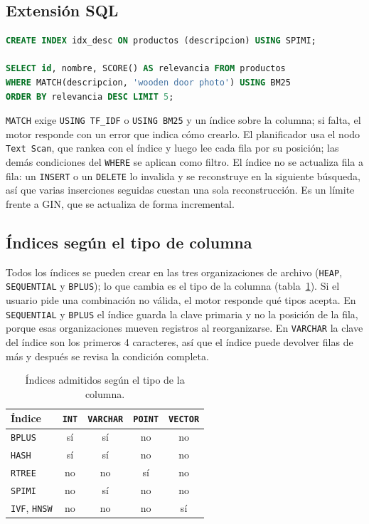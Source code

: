 \documentclass[11pt,a4paper]{article}
\begin{document}
\subsection{Extensión SQL}

\begin{lstlisting}[language=SQL]
CREATE INDEX idx_desc ON productos (descripcion) USING SPIMI;

SELECT id, nombre, SCORE() AS relevancia FROM productos
WHERE MATCH(descripcion, 'wooden door photo') USING BM25
ORDER BY relevancia DESC LIMIT 5;
\end{lstlisting}

\texttt{MATCH} exige \texttt{USING TF\_IDF} o \texttt{USING BM25} y un índice sobre la columna; si falta, el motor responde con un error que indica cómo crearlo. El planificador usa el nodo \texttt{Text Scan}, que rankea con el índice y luego lee cada fila por su posición; las demás condiciones del \texttt{WHERE} se aplican como filtro. El índice no se actualiza fila a fila: un \texttt{INSERT} o un \texttt{DELETE} lo invalida y se reconstruye en la siguiente búsqueda, así que varias inserciones seguidas cuestan una sola reconstrucción. Es un límite frente a GIN, que se actualiza de forma incremental.

\subsection{Índices según el tipo de columna}

Todos los índices se pueden crear en las tres organizaciones de archivo (\texttt{HEAP}, \texttt{SEQUENTIAL} y \texttt{BPLUS}); lo que cambia es el tipo de la columna (tabla~\ref{tab:indices-tipo}). Si el usuario pide una combinación no válida, el motor responde qué tipos acepta. En \texttt{SEQUENTIAL} y \texttt{BPLUS} el índice guarda la clave primaria y no la posición de la fila, porque esas organizaciones mueven registros al reorganizarse. En \texttt{VARCHAR} la clave del índice son los primeros 4 caracteres, así que el índice puede devolver filas de más y después se revisa la condición completa.

\begin{table}[H]
\centering
\begin{tabular}{lcccc}
\toprule
Índice & \texttt{INT} & \texttt{VARCHAR} & \texttt{POINT} & \texttt{VECTOR} \\
\midrule
\texttt{BPLUS} & sí & sí & no & no \\
\texttt{HASH} & sí & sí & no & no \\
\texttt{RTREE} & no & no & sí & no \\
\texttt{SPIMI} & no & sí & no & no \\
\texttt{IVF}, \texttt{HNSW} & no & no & no & sí \\
\bottomrule
\end{tabular}
\caption{Índices admitidos según el tipo de la columna.}
\label{tab:indices-tipo}
\end{table}
\end{document}
